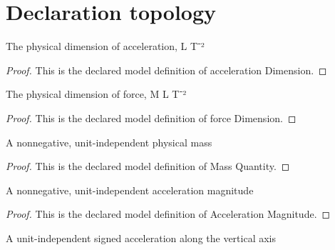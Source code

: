 \section{Declaration topology}
\begin{definition}
  \label{def:physics:phyx-mini-0762:phyxminiproblems-problemphyxmini0762-accelerationdimension}
  The physical dimension of acceleration, L T⁻²
\end{definition}
\begin{proof}
  This is the declared model definition of acceleration Dimension.
\end{proof}
\begin{definition}
  \label{def:physics:phyx-mini-0762:phyxminiproblems-problemphyxmini0762-forcedimension}
  The physical dimension of force, M L T⁻²
\end{definition}
\begin{proof}
  This is the declared model definition of force Dimension.
\end{proof}
\begin{definition}
  \label{def:physics:phyx-mini-0762:phyxminiproblems-problemphyxmini0762-massquantity}
  A nonnegative, unit-independent physical mass
\end{definition}
\begin{proof}
  This is the declared model definition of Mass Quantity.
\end{proof}
\begin{definition}
  \label{def:physics:phyx-mini-0762:phyxminiproblems-problemphyxmini0762-accelerationmagnitude}
  A nonnegative, unit-independent acceleration magnitude
\end{definition}
\begin{proof}
  This is the declared model definition of Acceleration Magnitude.
\end{proof}
\begin{definition}
  \label{def:physics:phyx-mini-0762:phyxminiproblems-problemphyxmini0762-signedacceleration}
  A unit-independent signed acceleration along the vertical axis
\end{definition}
